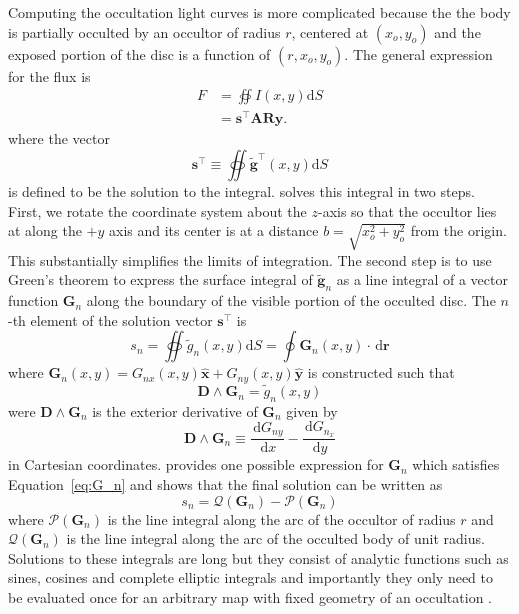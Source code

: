 \documentclass[12pt]{report}
\newcommand{\ud}{\,\mathrm{d}}
\begin{document}
Computing the occultation light curves is more complicated because the the body
is partially occulted by an occultor of radius $r$, centered at $(x_o, y_o)$
and the exposed portion of the disc is a function of $(r, x_o, y_o)$. The
general expression for the flux is
\begin{align}
    F & =\oiint I(x, y) \mathrm{d} S                         \\
      & =\mathbf{s}^\top  \mathbf{A} \mathbf{R} \mathbf{y} .
\end{align}
where the vector
\begin{equation}
    \mathbf{s}^\top \equiv \oiint \tilde{\mathbf{g}}^{\top}(x, y) \mathrm{d} S
\end{equation}
is defined to be the solution to the integral.
\citet{2019AJ....157...64L} solves this integral in two steps.  First, we rotate
the coordinate system about the  $z$-axis  so that the occultor lies at along the
$+y$ axis and its center is at
a distance $b=\sqrt{x_o^{2}+y_o^{2}}$ from the origin. This substantially simplifies
the limits of integration.
The second step is to use Green's theorem to express the surface integral of
$\tilde{\mathbf{g}}_n$ as a line integral of a vector function $\mathbf{G}_n$
along the boundary of the visible portion of the occulted disc.
The $n$-th element of the solution vector $\mathbf{s}^\top$ is
\begin{equation}
    s_{n}=\oiint \tilde{g}_{n}(x, y) \mathrm{d} S=\oint \mathbf{G}_{n}(x, y) \cdot \ud \mathbf{r}
\end{equation}
where
$\mathbf{G}_{n}(x, y)=G_{n x}(x, y) \hat{\mathbf{x}}+G_{n y}(x, y) \hat{\mathbf{y}}$
is constructed such that
\begin{equation}
    \mathbf{D} \wedge \mathbf{G}_{n}=\tilde{g}_{n}(x, y)
    \label{eq:G_n}
\end{equation}
were $\mathbf{D} \wedge \mathbf{G}_{n}$ is the exterior derivative of $\mathbf{G}_n$
given by
\begin{equation}
    \mathbf{D} \wedge \mathbf{G}_{n} \equiv \frac{\ud G_{n y}}{\ud x}-\frac{\ud G_{n_{x}}}{\ud y}
\end{equation}
in Cartesian coordinates.
\citet{2019AJ....157...64L} provides one possible expression for $\mathbf{G}_n$
which satisfies Equation~\ref{eq:G_n} and shows that the final solution can be written as
\begin{equation}
    s_{n}=\mathcal{Q}\left(\mathbf{G}_{n}\right)-\mathcal{P}\left(\mathbf{G}_{n}\right)
\end{equation}
where $\mathcal{P}(\mathbf{G}_n)$ is the  line integral along the arc of the occultor
of radius $r$ and $\mathcal{Q}(\mathbf{G}_n)$ is the line integral along the arc of the
occulted body of unit radius. Solutions to these integrals are long but they consist of
analytic functions such as sines, cosines and complete elliptic integrals and importantly
they only need to be evaluated once for an arbitrary map with fixed geometry of an
occultation \citep{2019AJ....157...64L}.
\end{document}
